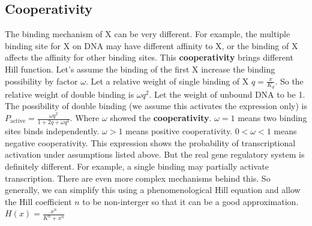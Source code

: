 \documentclass[UTF8,12pt,a4paper,fontset=fandol]{ctexart}
\begin{document}
\subsection{Cooperativity}

The binding mechanism of X can be very different. For example, the multiple binding site for X on DNA may have different affinity to X, or the binding of X affects the affinity for other binding sites. This \textbf{cooperativity} brings different Hill function.
\newline Let's assume the binding of the first X increase the binding possibility by factor $\omega$.
\newline Let a relative weight of single binding of X $q=\frac{x}{K_d}$.
\newline So the relative weight of double binding is $\omega q^2$.
\newline Let the weight of unbound DNA to be 1.
\newline The possibility of double binding (we assume this activates the expression only) is
\newline $P_{\text{active}}=\frac{\omega q^2}{1+2q+\omega q^2}$.
\newline Where $\omega$ showed the \textbf{cooperativity}.
\newline $\omega = 1$ means two binding sites binds independently.
\newline $\omega > 1$ means positive cooperativity.
\newline $0<\omega < 1$ means negative cooperativity.
\newline This expression shows the probability of transcriptional activation under assumptions listed above. But the real gene regulatory system is definitely different. For example, a single binding may partially activate transcription. There are even more complex mechanisms behind this.
\newline So generally, we can simplify this using a phenomenological Hill equation and allow the Hill coefficient $n$ to be non-interger so that it can be a good approximation.
\newline $H(x) = \frac{x^n}{K^n+x^n}$




\section{}

\subsection{}


\section{}
\end{document}
